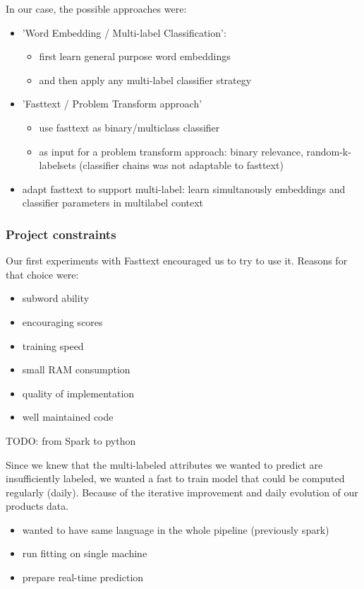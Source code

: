 In our case, the possible approaches were:
\begin{itemize}
	\item 'Word Embedding / Multi-label Classification':
	\begin{itemize}
		\item first learn general purpose word embeddings
		\item and then apply any multi-label classifier strategy
	\end{itemize}
	\item 'Fasttext / Problem Transform approach'
	\begin{itemize}
		\item use fasttext as binary/multiclass classifier
		\item as input for a problem transform approach: binary relevance, random-k-labelsets (classifier chains was not adaptable to fasttext)
	\end{itemize}
	\item adapt fasttext to support multi-label: learn simultanously embeddings and classifier parameters in multilabel context
\end{itemize}

\subsubsection{Project constraints}


Our first experiments with Fasttext encouraged us to try to use it. Reasons for that choice were:
\begin{itemize}
	\item subword ability
	\item encouraging scores
	\item training speed
	\item small RAM consumption
	\item quality of implementation
	\item well maintained code
\end{itemize}

TODO: from Spark to python

Since we knew that the multi-labeled attributes we wanted to predict are insufficiently labeled, we wanted a fast to train model that could be computed regularly (daily). Because of the iterative improvement and daily evolution of our products data. 

\begin{itemize}
	\item wanted to have same language in the whole pipeline (previously spark)
	\item run fitting on single machine
	\item prepare real-time prediction

\end{itemize}

